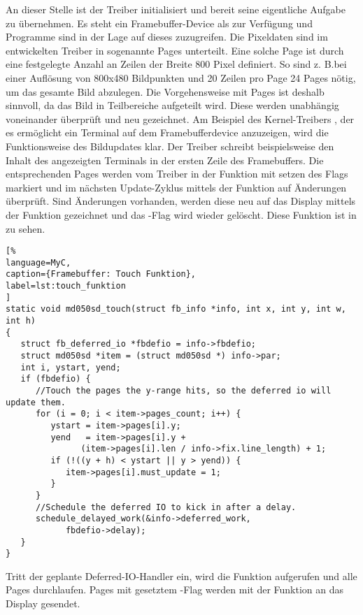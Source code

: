 An dieser Stelle ist der Treiber initialisiert und bereit seine eigentliche Aufgabe zu übernehmen. Es steht ein Framebuffer-Device als  zur Verfügung und Programme sind in der Lage auf dieses zuzugreifen.
Die Pixeldaten sind im entwickelten Treiber in sogenannte Pages unterteilt. Eine solche Page ist durch eine festgelegte Anzahl an Zeilen der Breite 800 Pixel definiert. So sind z. B.bei einer Auflösung von 800x480 Bildpunkten und 20 Zeilen pro Page 24 Pages nötig, um das gesamte Bild abzulegen. Die Vorgehensweise mit Pages ist deshalb sinnvoll, da das Bild in Teilbereiche aufgeteilt wird. Diese werden unabhängig voneinander überprüft und neu gezeichnet. Am Beispiel des Kernel-Treibers , der es ermöglicht ein Terminal auf dem Framebufferdevice anzuzeigen, wird die Funktionsweise des Bildupdates klar. Der Treiber  schreibt beispielsweise den Inhalt des angezeigten Terminals in der ersten Zeile des Framebuffers. Die entsprechenden Pages werden vom Treiber in der Funktion  mit setzen des Flags  markiert und im nächsten Update-Zyklus mittels der Funktion  auf Änderungen überprüft. Sind Änderungen vorhanden, werden diese neu auf das Display mittels der Funktion  gezeichnet und das -Flag wird wieder gelöscht. Diese Funktion ist in
 zu sehen. 
\begin{lstlisting}[%
language=MyC,
caption={Framebuffer: Touch Funktion},
label=lst:touch_funktion
]
static void md050sd_touch(struct fb_info *info, int x, int y, int w, int h)
{
   struct fb_deferred_io *fbdefio = info->fbdefio;
   struct md050sd *item = (struct md050sd *) info->par;
   int i, ystart, yend;
   if (fbdefio) {
      //Touch the pages the y-range hits, so the deferred io will update them.
      for (i = 0; i < item->pages_count; i++) {
         ystart = item->pages[i].y;
         yend   = item->pages[i].y +
               (item->pages[i].len / info->fix.line_length) + 1;
         if (!((y + h) < ystart || y > yend)) {
            item->pages[i].must_update = 1;
         }
      }
      //Schedule the deferred IO to kick in after a delay.
      schedule_delayed_work(&info->deferred_work,
            fbdefio->delay);
   }
}
\end{lstlisting}
Tritt der geplante Deferred-IO-Handler ein, wird die Funktion  aufgerufen und alle Pages durchlaufen. Pages mit gesetztem -Flag werden mit der Funktion  an das Display gesendet.
